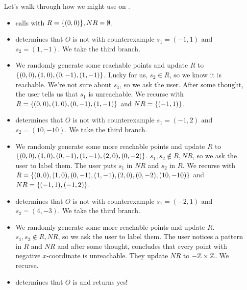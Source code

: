 Let's walk through how we might use \IsIconfluent{} on
.
\begin{itemize}
  \item
    \IsIconfluent{} calls \Helper{} with $R = \{(0, 0)\}, NR = \emptyset{}$.

  \item
    \Helper{} determines that $O$ is not  with
    counterexample $s_1 = (-1, 1)$ and $s_2 = (1, -1)$. We take the third
    branch.

  \item
    We randomly generate some reachable points and update $R$ to $\{(0, 0),
    (1, 0), (0, -1), (1, -1)\}$. Lucky for us, $s_2 \in R$, so we know it is
    reachable. We're not sure about $s_1$, so we ask the user. After some
    thought, the user tells us that $s_1$ is unreachable. We recurse with $R =
    \{(0, 0), (1, 0), (0, -1), (1, -1)\}$ and $NR = \{(-1, 1)\}$.

  \item
    \Helper{} determines that $O$ is not  with
    counterexample $s_1 = (-1, 2)$ and $s_2 = (10, -10)$. We take the third
    branch.

  \item
    We randomly generate some more reachable points and update $R$ to $\{(0,
    0), (1, 0), (0, -1), (1, -1), (2, 0), (0, -2)\}$. $s_1, s_2 \notin R, NR$,
    so we ask the user to label them. The user puts $s_1$ in $NR$ and $s_2$ in
    $R$. We recurse with $R = \{(0, 0), (1, 0), (0, -1), (1, -1), (2, 0),
    (0, -2), (10, -10)\}$ and $NR = \{(-1, 1), (-1, 2)\}$.

  \item
    \Helper{} determines that $O$ is not  with
    counterexample $s_1 = (-2, 1)$ and $s_2 = (4, -3)$. We take the third
    branch.

  \item
    We randomly generate some more reachable points and update $R$. $s_1, s_2
    \notin R, NR$, so we ask the user to label them. The user notices a pattern
    in $R$ and $NR$ and after some thought, concludes that every point with
    negative $x$-coordinate is unreachable. They update $NR$ to $-\mathbb{Z} \times
    \mathbb{Z}$. We recurse.

  \item
    \Helper{} determines that $O$ is  and returns yes!
\end{itemize}

